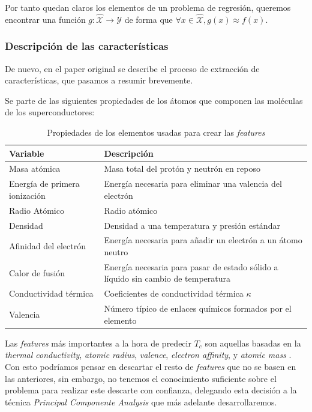 \documentclass[11pt]{article}
\begin{document}
Por tanto quedan claros los elementos de un problema de regresión, queremos encontrar una función $g: \hat{\mathcal{X}} \rightarrow \mathcal{Y}$ de forma que $\forall x \in \hat{\mathcal{X}}, g(x) \approx f(x)$.

\subsubsection{Descripción de las características} \label{descripcion_caracteristicas}

De nuevo, en el paper original \cite{original_paper_reg:paper} se describe el proceso de extracción de características, que pasamos a resumir brevemente.

Se parte de las siguientes propiedades de los átomos que componen las moléculas de los superconductores:

\begin{table}[H]
\begin{tabularx}{\textwidth}{|X|X|}
    \hline
    \textbf{Variable} & \textbf{Descripción} \\
    \hline
    Masa atómica & Masa total del protón y neutrón en reposo \\
    Energía de primera ionización & Energía necesaria para eliminar una valencia del electrón \\
    Radio Atómico & Radio atómico \\
    Densidad & Densidad a una temperatura y presión estándar \\
    Afinidad del electrón & Energía necesaria para añadir un electrón a un átomo neutro \\
    Calor de fusión & Energía necesaria para pasar de estado sólido a líquido sin cambio de temperatura \\
    Conductividad térmica &  Coeficientes de conductividad térmica $\kappa$ \\
    Valencia & Número típico de enlaces químicos formados por el elemento \\
    \hline
\end{tabularx}
\caption{Propiedades de los elementos usadas para crear las \emph{features} }
\end{table}

Las \emph{features} más importantes a la hora de predecir $T_c$ son aquellas basadas en la \emph{thermal conductivity}, \emph{atomic radius}, \emph{valence}, \emph{electron affinity}, y \emph{atomic mass} \cite{original_paper_reg:paper}. Con esto podríamos pensar en descartar el resto de \emph{features} que no se basen en las anteriores, sin embargo, no tenemos el conocimiento suficiente sobre el problema para realizar este descarte con confianza, delegando esta decisión a la técnica \emph{Principal Componente Analysis} que más adelante desarrollaremos.
\end{document}
